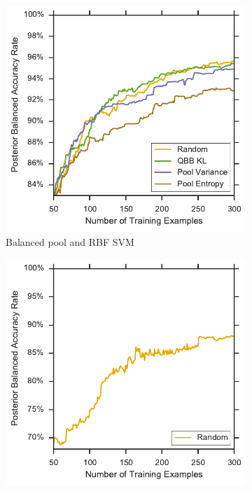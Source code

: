 \begin{figure}[p]
\begin{subfigure}{.5\textwidth}
		\includegraphics[width=\linewidth]{figures/5_active/vstatlas_br_ind_lower}
		\caption{Balanced pool and RBF SVM}
		\label{fig:vstatlas_br_ind_lower}
	\end{subfigure}
	\begin{subfigure}{.5\textwidth}
		\centering
		\includegraphics[width=\textwidth]{figures/5_active/vstatlas_ul_ind_lower}

\end{subfigure}
\end{figure}
